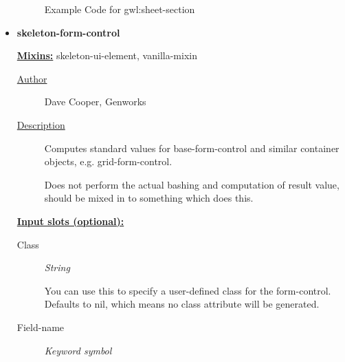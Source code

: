 \documentclass [11pt]{book}
\begin{document}
\begin{itemize}
\begin{figure}
\begin{lrbox}{\boxedverb}
\begin{minipage}{\linewidth}
{\begin{verbatim}
\end{verbatim}}
\end{minipage}
\end{lrbox}
\fbox{\usebox{\boxedverb}}

\caption{Example Code for gwl:sheet-section}

\label{fig:example-code-gwl:sheet-section}

\end{figure}






\item {}
\label{prim:skeleton-form-control}
\textbf{skeleton-form-control}


\textbf{
\underline{Mixins:}} skeleton-ui-element, vanilla-mixin





\begin{description}

\item [
\underline{Author}]


Dave Cooper, Genworks



\item [
\underline{Description}]


Computes standard values for base-form-control and similar container objects, e.g. grid-form-control.

Does not perform the actual bashing and computation of result value, should be mixed in to something which does this.



\end{description}








\textbf{
\underline{Input slots (optional):}}

\begin{description}

\item [Class]
\emph{String}

 You can use this to specify a user-defined class for the form-control. Defaults to nil, which means no class attribute will be generated.




\item [Field-name]
\emph{Keyword symbol}


\end{description}
\end{itemize}
\end{document}
